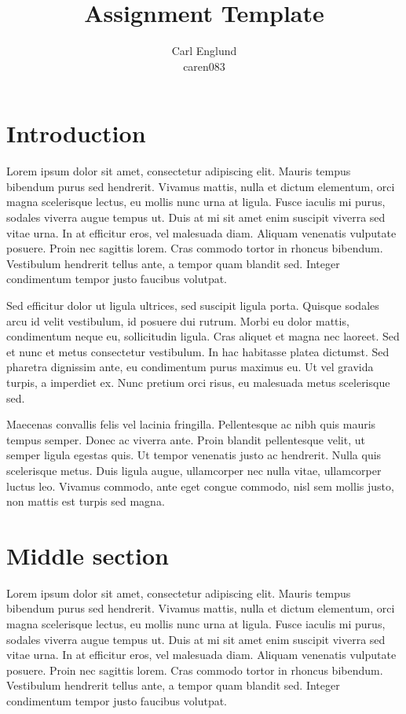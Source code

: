 \documentclass[a4paper, 12pt, titlepage]{article}
\title{Assignment Template}
\author{Carl Englund \\ caren083}
\begin{document}
\maketitle %


\section{Introduction}

Lorem ipsum dolor sit amet, consectetur adipiscing elit. Mauris tempus bibendum purus sed hendrerit. Vivamus mattis, nulla et dictum elementum, orci magna scelerisque lectus, eu mollis nunc urna at ligula. Fusce iaculis mi purus, sodales viverra augue tempus ut. Duis at mi sit amet enim suscipit viverra sed vitae urna. In at efficitur eros, vel malesuada diam. Aliquam venenatis vulputate posuere. Proin nec sagittis lorem. Cras commodo tortor in rhoncus bibendum. Vestibulum hendrerit tellus ante, a tempor quam blandit sed. Integer condimentum tempor justo faucibus volutpat.

Sed efficitur dolor ut ligula ultrices, sed suscipit ligula porta. Quisque sodales arcu id velit vestibulum, id posuere dui rutrum. Morbi eu dolor mattis, condimentum neque eu, sollicitudin ligula. Cras aliquet et magna nec laoreet. Sed et nunc et metus consectetur vestibulum. In hac habitasse platea dictumst. Sed pharetra dignissim ante, eu condimentum purus maximus eu. Ut vel gravida turpis, a imperdiet ex. Nunc pretium orci risus, eu malesuada metus scelerisque sed.

Maecenas convallis felis vel lacinia fringilla. Pellentesque ac nibh quis mauris tempus semper. Donec ac viverra ante. Proin blandit pellentesque velit, ut semper ligula egestas quis. Ut tempor venenatis justo ac hendrerit. Nulla quis scelerisque metus. Duis ligula augue, ullamcorper nec nulla vitae, ullamcorper luctus leo. Vivamus commodo, ante eget congue commodo, nisl sem mollis justo, non mattis est turpis sed magna.




\section{Middle section}

Lorem ipsum dolor sit amet, consectetur adipiscing elit. Mauris tempus bibendum purus sed hendrerit. Vivamus mattis, nulla et dictum elementum, orci magna scelerisque lectus, eu mollis nunc urna at ligula. Fusce iaculis mi purus, sodales viverra augue tempus ut. Duis at mi sit amet enim suscipit viverra sed vitae urna. In at efficitur eros, vel malesuada diam. Aliquam venenatis vulputate posuere. Proin nec sagittis lorem. Cras commodo tortor in rhoncus bibendum. Vestibulum hendrerit tellus ante, a tempor quam blandit sed. Integer condimentum tempor justo faucibus volutpat.
\end{document}

